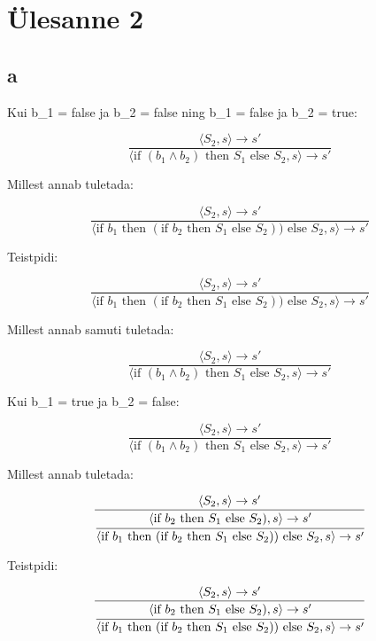 \section{Ülesanne 2}

\subsection{a}

Kui b_1 = false \; ja \; b_2 = false \; ning \; b_1 = false \; ja \; b_2
= true:

\[
  \frac{
    \langle S_2, s \rangle \rightarrow s'
  }
  {
    \langle \text{if } (b_1 \wedge b_2) \text{ then } S_1 \text{ else }
    S_2, s \rangle \rightarrow s'
  }
\]

Millest annab tuletada:

\[
  \frac{
    \langle S_2, s \rangle \rightarrow s'
  }{
    \langle \text{if } b_1 \text{ then } (\text{if } b_2 \text{ then } S_1 \text{ else }
    S_2)) \text{ else } S_2, s \rangle \rightarrow s'
  }
\]

Teistpidi:

\[
  \frac{
    \langle S_2, s \rangle \rightarrow s'
  }{
    \langle \text{if } b_1 \text{ then } (\text{if } b_2 \text{ then } S_1 \text{ else }
    S_2)) \text{ else } S_2, s \rangle \rightarrow s'
  }
\]

Millest annab samuti tuletada:

\[
  \frac{
    \langle S_2, s \rangle \rightarrow s'
  }
  {
    \langle \text{if } (b_1 \wedge b_2) \text{ then } S_1 \text{ else }
    S_2, s \rangle \rightarrow s'
  }
\]


Kui b_1 = true \; ja \; b_2 = false:

\[
  \frac{
    \langle S_2, s \rangle \rightarrow s'
  }
  {
    \langle \text{if } (b_1 \wedge b_2) \text{ then } S_1 \text{ else }
    S_2, s \rangle \rightarrow s'
  }
\]

Millest annab tuletada:

\[
  \frac{
    \langle S_2, s \rangle \rightarrow s'
  }{
    \cfrac{
      \langle \text{if } b_2 \text{ then } S_1 \text{ else }
      S_2), s \rangle \rightarrow s'
    }{
      \langle \text{if } b_1 \text{ then } (\text{if } b_2 \text{ then } S_1 \text{ else }
      S_2)) \text{ else } S_2, s \rangle \rightarrow s'
    }
  }
\]

Teistpidi:

\[
  \frac{
    \langle S_2, s \rangle \rightarrow s'
  }{
    \cfrac{
      \langle \text{if } b_2 \text{ then } S_1 \text{ else }
      S_2), s \rangle \rightarrow s'
    }{
      \langle \text{if } b_1 \text{ then } (\text{if } b_2 \text{ then } S_1 \text{ else }
      S_2)) \text{ else } S_2, s \rangle \rightarrow s'
    }
  }
\]

